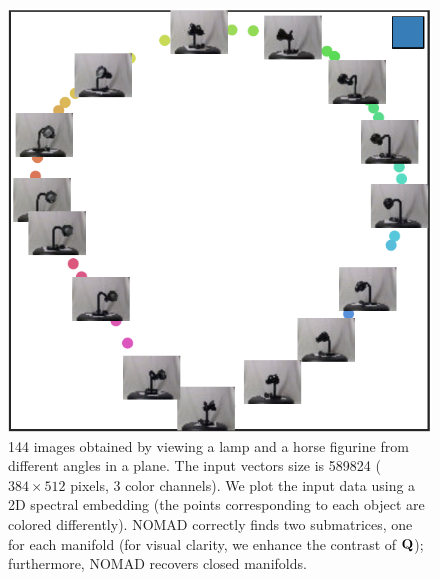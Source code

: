 \documentclass[twoside,11pt]{article}
\begin{document}
\begin{figure}[p]
\begin{minipage}[t]{.39\textwidth}
\begin{tabu}
			\includegraphics[width=\linewidth]{cluster-embedding/turntable_embedding_35_cluster1}%
		\end{tabu}
	\end{minipage}
	
	\caption{144 images obtained by viewing a lamp and a horse figurine from different angles in a plane. The input vectors size is 589824 ($384 \times 512$ pixels, 3 color channels).
	We plot the input data using a 2D spectral embedding (the points corresponding to each object are colored differently).
	NOMAD correctly finds two submatrices, one for each manifold (for visual clarity, we enhance the contrast of ${\mathbf{Q}}$); furthermore, NOMAD recovers closed manifolds.
	}
\label{fig:joint}
\end{figure}
\end{document}
